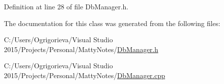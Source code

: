 Definition at line 28 of file Db\+Manager.\+h.



The documentation for this class was generated from the following files\+:\begin{DoxyCompactItemize}
\item 
C\+:/\+Users/\+Ogrigorieva/\+Visual Studio 2015/\+Projects/\+Personal/\+Matty\+Notes/\hyperlink{DbManager_8h}{Db\+Manager.\+h}\item 
C\+:/\+Users/\+Ogrigorieva/\+Visual Studio 2015/\+Projects/\+Personal/\+Matty\+Notes/\hyperlink{DbManager_8cpp}{Db\+Manager.\+cpp}\end{DoxyCompactItemize}
